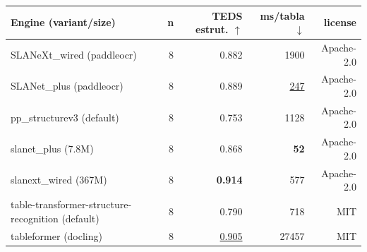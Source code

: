 \documentclass[border=2pt]{standalone}
\begin{document}
\begin{tabular}{lrrrr}
\toprule
Engine (variant/size) & n & TEDS estrut. $\uparrow$ & ms/tabla $\downarrow$ & license \\
\midrule
SLANeXt\_wired (paddleocr) & 8 & 0.882 & 1900 & Apache-2.0 \\
SLANet\_plus (paddleocr) & 8 & 0.889 & \underline{247} & Apache-2.0 \\
pp\_structurev3 (default) & 8 & 0.753 & 1128 & Apache-2.0 \\
slanet\_plus (7.8M) & 8 & 0.868 & \textbf{52} & Apache-2.0 \\
slanext\_wired (367M) & 8 & \textbf{0.914} & 577 & Apache-2.0 \\
table-transformer-structure-recognition (default) & 8 & 0.790 & 718 & MIT \\
tableformer (docling) & 8 & \underline{0.905} & 27457 & MIT \\
\bottomrule
\end{tabular}
\par{}
\end{document}
